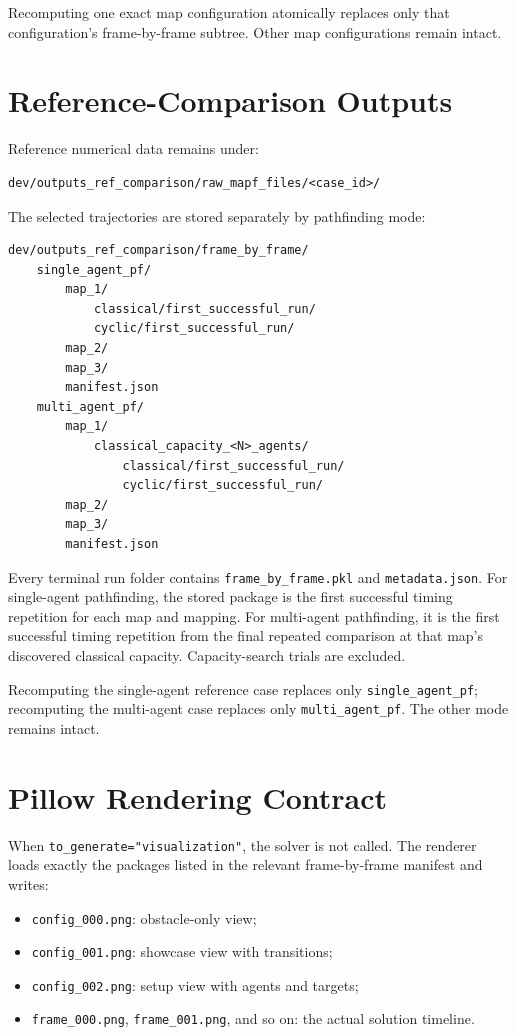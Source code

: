 \documentclass[11pt]{article}
\begin{document}
Recomputing one exact map configuration atomically replaces only that configuration's frame-by-frame subtree. Other map configurations remain intact.

\section{Reference-Comparison Outputs}

Reference numerical data remains under:
\begin{lstlisting}
dev/outputs_ref_comparison/raw_mapf_files/<case_id>/
\end{lstlisting}

The selected trajectories are stored separately by pathfinding mode:
\begin{lstlisting}
dev/outputs_ref_comparison/frame_by_frame/
    single_agent_pf/
        map_1/
            classical/first_successful_run/
            cyclic/first_successful_run/
        map_2/
        map_3/
        manifest.json
    multi_agent_pf/
        map_1/
            classical_capacity_<N>_agents/
                classical/first_successful_run/
                cyclic/first_successful_run/
        map_2/
        map_3/
        manifest.json
\end{lstlisting}

Every terminal run folder contains \texttt{frame\_by\_frame.pkl} and \texttt{metadata.json}. For single-agent pathfinding, the stored package is the first successful timing repetition for each map and mapping. For multi-agent pathfinding, it is the first successful timing repetition from the final repeated comparison at that map's discovered classical capacity. Capacity-search trials are excluded.

Recomputing the single-agent reference case replaces only \texttt{single\_agent\_pf}; recomputing the multi-agent case replaces only \texttt{multi\_agent\_pf}. The other mode remains intact.

\section{Pillow Rendering Contract}

When \texttt{to\_generate="visualization"}, the solver is not called. The renderer loads exactly the packages listed in the relevant frame-by-frame manifest and writes:
\begin{itemize}[leftmargin=2em]
    \item \texttt{config\_000.png}: obstacle-only view;
    \item \texttt{config\_001.png}: showcase view with transitions;
    \item \texttt{config\_002.png}: setup view with agents and targets;
    \item \texttt{frame\_000.png}, \texttt{frame\_001.png}, and so on: the actual solution timeline.
\end{itemize}
\end{document}
